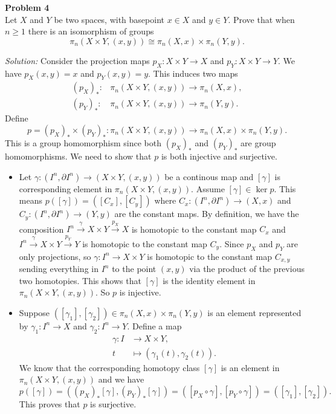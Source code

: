 \documentclass[a4paper, 12pt]{article}
\newenvironment{problem}[2][Problem]
    { \begin{mdframed}[backgroundcolor=gray!20] \textbf{#1 #2} \\}
    {  \end{mdframed}}
\newenvironment{solution}
    {\textit{Solution:}}
    {}
\begin{document}
\begin{problem}{4}
Let \(X\) and \(Y\) be two spaces, with basepoint \(x\in X\) and \(y\in Y\). Prove that when \(n\geq 1\) there is an isomorphism of groups 
\[\pi_n(X\times Y,(x,y))\cong \pi_n(X,x)\times \pi_n(Y,y).\]
\end{problem}
\begin{solution}
Consider the projection maps \(p_X:X\times Y\rightarrow X\) and \(p_Y:X\times Y\rightarrow Y\). We have \(p_X(x,y)=x\) and \(p_Y(x,y)=y\). This induces two maps 
\begin{align*}
    (p_X)_*:&\pi_n(X\times Y,(x,y))\rightarrow \pi_n(X,x),\\ 
    (p_Y)_*:&\pi_n(X\times Y,(x,y))\rightarrow \pi_n(Y,y).
\end{align*}
Define 
\[p=(p_X)_*\times (p_Y)_*:\pi_n(X\times Y,(x,y))\rightarrow \pi_n(X,x)\times \pi_n(Y,y).\]
This is a group homomorphism since both \((p_X)_*\) and \((p_Y)_*\) are group homomorphisms. We need to show that \(p\) is both injective and surjective. 
\begin{itemize}
\item Let \(\gamma:(I^n,\partial I^n)\rightarrow (X\times Y,(x,y))\) be a continous map and \([\gamma]\) is corresponding element in \(\pi_n(X\times Y,(x,y))\). Assume \([\gamma]\in \ker p\). This means 
\(p([\gamma])=([C_x],[C_y])\) where \(C_x:(I^n,\partial I^n)\rightarrow (X,x)\) and \(C_y:(I^n,\partial I^n)\rightarrow (Y,y)\) are the constant maps. By definition, we have the composition 
\(I^n\xrightarrow{\gamma} X\times Y\xrightarrow{p_X} X\) is homotopic to the constant map \(C_x\) and \(I^n\xrightarrow{\gamma}X\times Y\xrightarrow{p_Y} Y\) is homotopic to the constant map \(C_y\). Since \(p_X\) and \(p_Y\) are only 
projections, so \(\gamma:I^n\rightarrow X\times Y\) is homotopic to the constant map \(C_{x,y}\) sending everything in \(I^n\) to the point \((x,y)\) via the product of the previous two homotopies. This shows that \([\gamma]\) is the identity element in \(\pi_n(X\times Y,(x,y))\). So 
\(p\) is injective.
\item Suppose \(([\gamma_1],[\gamma_2])\in \pi_n(X,x)\times \pi_n(Y,y)\) is an element represented by \(\gamma_1:I^n\rightarrow X\) and \(\gamma_2:I^n\rightarrow Y\). Define a map 
\begin{align*}
    \gamma:I&\rightarrow X\times Y,\\ 
    t&\mapsto (\gamma_1(t),\gamma_2(t)).
\end{align*}
We know that the corresponding homotopy class \([\gamma]\) is an element in \(\pi_n(X\times Y,(x,y))\) and we have 
\[p([\gamma])=((p_X)_*[\gamma],(p_Y)_*[\gamma])=([p_X\circ \gamma],[p_Y\circ \gamma])=([\gamma_1],[\gamma_2]).\]
This proves that \(p\) is surjective.
\end{itemize}
\end{solution}
\end{document}
